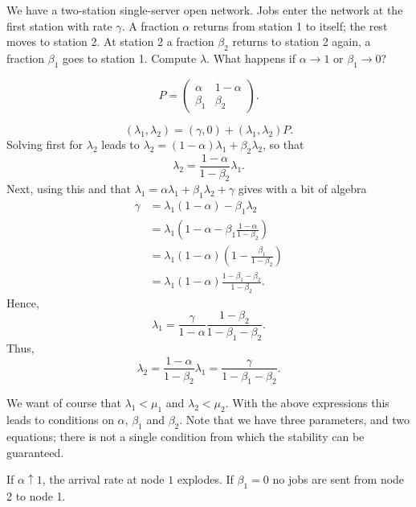 \begin{exercise}
 We have a two-station single-server open network.
 Jobs enter the network at the first station with rate $\gamma$.
 A fraction $\alpha$ returns from station 1 to itself; the rest moves to station 2. At station 2 a fraction $\beta_2$ returns to station 2 again, a fraction $\beta_1$ goes to station 1. Compute $\lambda$. What happens if $\alpha\to 1$ or $\beta_1\to 0$? 
\begin{solution}
 \begin{equation*}
 P = 
 \begin{pmatrix}
 \alpha & 1- \alpha \\
 \beta_1 & \beta_2
 \end{pmatrix}.
 \end{equation*}

 \begin{equation*}
 (\lambda_1, \lambda_2) = (\gamma, 0) + (\lambda_1, \lambda_2) P.
 \end{equation*}
Solving first for $\lambda_2$ leads to $\lambda_2 = (1-\alpha) \lambda_1 + \beta_2 \lambda_2$, so that 
\begin{equation*}
 \lambda_2 = \frac{1-\alpha}{1-\beta_2} \lambda_1. 
\end{equation*}
Next, using this and that $\lambda_1 = \alpha \lambda_1 + \beta_1 \lambda_2 + \gamma$ gives with a bit of algebra
\begin{equation*}
 \begin{split}
\gamma 
&= \lambda_1(1-\alpha) - \beta_1\lambda_2 \\
&= \lambda_1\left(1-\alpha - \beta_1\frac{1-\alpha}{1-\beta_2}\right) \\
&= \lambda_1(1-\alpha)\left(1 - \frac{\beta_1 }{1-\beta_2}\right) \\
&= \lambda_1(1-\alpha)\frac{1-\beta_1-\beta_2 }{1-\beta_2}.
 \end{split}
\end{equation*}
Hence, 
\begin{equation*}
 \lambda_1 = \frac\gamma{1-\alpha}\frac{1-\beta_2}{1-\beta_1-\beta_2}. 
\end{equation*}
Thus, 
\begin{equation*}
 \lambda_2 = \frac{1-\alpha}{1-\beta_2} \lambda_1 = \frac\gamma{1-\beta_1-\beta_2}. 
\end{equation*}


We want of course that $\lambda_1 < \mu_1$ and $\lambda_2 < \mu_2$.
With the above expressions this leads to conditions on $\alpha$, $\beta_1$ and $\beta_2$.
Note that we have three parameters, and two equations; there is not a single condition from which the stability can be guaranteed.

If $\alpha\uparrow 1$, the arrival rate at node $1$ explodes.
If $\beta_1=0$ no jobs are sent from node 2 to node 1.
\end{solution}
\end{exercise}


